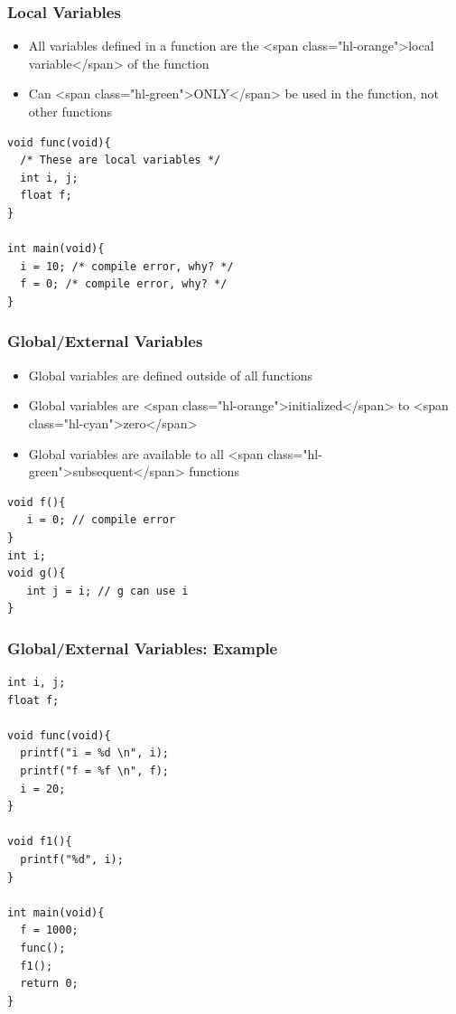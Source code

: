 \documentclass{../c-lecture}
\begin{document}
\begin{frame}[fragile]
  \frametitle{Local Variables}
  \begin{itemize}
    \item
      All variables defined in a function are the
      <span class="hl-orange">local variable</span> of the function

    \item
      Can <span class="hl-green">ONLY</span> be used in the function, not other
      functions

  \end{itemize}
  \begin{verbatim}
void func(void){
  /* These are local variables */
  int i, j;
  float f;
}

int main(void){
  i = 10; /* compile error, why? */
  f = 0; /* compile error, why? */
}
  \end{verbatim}
\end{frame}

\begin{frame}[fragile]
  \frametitle{Global/External Variables}
  \begin{itemize}
    \item Global variables are defined outside of all functions
    \item
      Global variables are <span class="hl-orange">initialized</span> to
      <span class="hl-cyan">zero</span>

    \item
      Global variables are available to all
      <span class="hl-green">subsequent</span> functions

  \end{itemize}
  \begin{verbatim}
void f(){
   i = 0; // compile error
}
int i;
void g(){
   int j = i; // g can use i
}
  \end{verbatim}
\end{frame}

\begin{frame}[fragile]
  \frametitle{Global/External Variables: Example}
  \begin{verbatim}
int i, j;
float f;

void func(void){
  printf("i = %d \n", i);
  printf("f = %f \n", f);
  i = 20;
}

void f1(){
  printf("%d", i);
}

int main(void){
  f = 1000;
  func();
  f1();
  return 0;
}
  \end{verbatim}
\end{frame}
\end{document}
